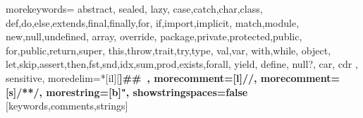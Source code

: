 

%
{morekeywords={
  abstract, sealed, lazy,
  case,catch,char,class,%
  def,do,else,extends,final,finally,for,%
  if,import,implicit,%
  match,module,%
  new,null,undefined,%
  array,
  override,%
  package,private,protected,public,%
  for,public,return,super,%
  this,throw,trait,try,type,%
  val,var,%
  with,while,%
  object,
  let,skip,assert,then,fst,snd,idx,sum,prod,exists,forall,%
  yield,%
  define, null?, car, cdr
  },%
  sensitive,%
  moredelim=*[il][\bfseries]{\#\#\ },
  morecomment=[l]//,%
  morecomment=[s]{/*}{*/},%
  morestring=[b]",%
  showstringspaces=false%
}[keywords,comments,strings]%


